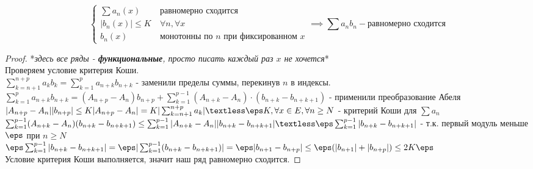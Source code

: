 
\begin{statement} \thmslashn

	\begin{equation*}
		\begin{cases}
			\sum a_n(x) &\ \text{равномерно сходится} \\
			|b_n(x)| \leq K &\ \forall{n}, \forall{x} \\
			b_n(x) &\ \text{монотонны по $n$ при фиксированном $x$}
		\end{cases}
		\implies \sum a_n b_n - \text{равномерно сходится}
	\end{equation*}
	\begin{proof} \thmslashn
	
		*\textit{здесь все ряды - \textbf{функциональные}, просто писать каждый раз $x$ не хочется}* \\
		Проверяем условие критерия Коши. \\
		$\sum^{n+p}_{k = n+1} a_k b_k = \sum^p_{k = 1} a_{n+k} b_{n+k}$ - заменили пределы суммы, перекинув $n$ в индексы. \\
		$\sum^p_{k = 1} a_{n+k} b_{n+k} = (A_{n+p} - A_n)b_{n+p} + \sum^{p-1}_{k = 1}(A_{n+k} - A_n)\cdot(b_{n+k} - b_{n+k+1})$
		 - применили преобразование Абеля \\
		$|A_{n+p} - A_n||b_{n+p}| \leq K|A_{n+p} - A_n| = K|\sum^{n+p}_{k = n+1} a_k| \textless \eps K, \forall{x \in E}, \forall{n \geq N}$ - критерий Коши для $\sum a_n$ \\
		$\sum^{p - 1}_{k = 1}(A_{n+k} - A_n)(b_{n+k} - b_{n+k+1}) \leq \sum^{p-1}_{k = 1}|A_{n+k} - A_n||b_{n+k} - b_{n+k+1}| \textless \eps\sum^{p-1}_{k = 1}|b_{n+k} - b_{n+k+1}|$ - т.к. первый модуль меньше $\eps$ при $n \geq N$\\
		$\eps\sum^{p-1}_{k = 1}|b_{n+k} - b_{n+k+1}| = \eps|\sum^{p-1}_{k = 1}(b_{n+k} - b_{n+k+1})| = \eps|b_{n+1} - b_{n+p}| \leq \eps(|b_{n+1}| + |b_{n+p}|) \leq 2K\eps$ \\
		Условие критерия Коши выполняется, значит наш ряд равномерно сходится.
	\end{proof}
\end{statement}
